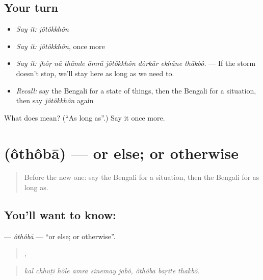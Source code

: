 \subsection*{Your turn}
\begin{itemize}
\raggedright
  \item \emph{Say it:} \emph{jôtôkkhôn}
  \item \emph{Say it:} \emph{jôtôkkhôn}, once more
  \item \emph{Say it:} \emph{jhôṛ nā thāmle āmrā jôtôkkhôn dôrkār ekhāne thākbô.} — If the storm doesn't stop, we'll stay here as long as we need to.
  \item \emph{Recall:} say the Bengali for a state of things, then the Bengali for a situation, then say \emph{jôtôkkhôn} again
\end{itemize}

\begin{tcolorbox}[breakable,colback=teal!4,colframe=teal!35!black,title={Before you move on}]
What does  mean? (\textquotedblleft{}As long as\textquotedblright{}.) Say it once more.
\end{tcolorbox}
\section[\texorpdfstring{\bn{অথবা} (ôthôbā)}{অথবা (ôthôbā)}]{ (ôthôbā) — or else; or otherwise}

\label{lesson:BN-C368-othoba}



\begin{quote}
Before the new one: say the Bengali for a situation, then the Bengali for as long as.
\end{quote}

\subsection*{You'll want to know: }
\textbf{} — \emph{ôthôbā} — \textquotedblleft{}or else; or otherwise\textquotedblright{}.

\begin{quote}
     ,   
\end{quote}

\begin{quote}
\emph{kāl chhuṭi hôle āmrā sinemāy jābô, ôthôbā bāṛite thākbô.}
\end{quote}

